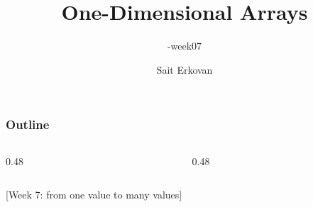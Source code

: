 \documentclass[aspectratio=169,10pt,compress]{beamer}
\title[\cisOOO-week07-Arrays 1D]{
	One-Dimensional Arrays
}
\subtitle{
	\cisOOO-week07
}
\author[Erkovan]{Sait Erkovan}
\institute[FCIS]{
	Faculty of Computer and Information Sciences\\
	Yeditepe University
}
\date{{\tiny \hbTimeStamp}}
\begin{document}




\begin{frame}[t,fragile]
	\titlepage
\end{frame}




\begin{frame}[t,fragile] \frametitle{Outline}
	\begin{columns}[T]
		\begin{column}{0.48\textwidth}
			\tableofcontents[sections={1-3}, hideallsubsections]
		\end{column}
		\begin{column}{0.48\textwidth}
			\tableofcontents[sections={4-6}, hideallsubsections]
		\end{column}
	\end{columns}
\end{frame}




[\small Week 7: from one value to many values]
\end{document}
